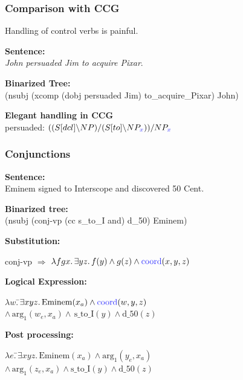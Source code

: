 \documentclass[mathserif,12pt]{beamer}
\newcommand{\hlight}[1]{{\color{blue!80} #1}}
\renewcommand{\land}{\wedge}
\newcommand{\lspace}{.\,}
\begin{document}
\begin{frame}[noframenumbering]
\frametitle{Comparison with CCG}

Handling of control verbs is painful.

\vspace{0.5cm}
\textbf{Sentence:}\\
\textsl{John persuaded Jim to acquire Pixar}.

\vspace{0.3cm}
\textbf{Binarized Tree:}\\
(nsubj (xcomp (dobj persuaded Jim) to\_acquire\_Pixar) John)

\pause
\vspace{0.3cm}
\textbf{Elegant handling in CCG} \\
\hspace{0.5cm} persuaded: $((S[dcl]\backslash NP)/(S[to]\backslash NP_{\hlight{x}}))/NP_{\hlight{x}}$
\end{frame}


\begin{frame}[noframenumbering]
\frametitle{Conjunctions}

\textbf{Sentence:} \\
{\centering Eminem signed to Interscope and discovered 50 Cent. \\} 

\vspace{0.3cm}  
\textbf{Binarized tree:} \\
{\centering (nsubj (conj-vp (cc s\_to\_I and) d\_50) Eminem) \\}

\pause
\vspace{0.3cm}  
\textbf{Substitution:} 

\begin{tabbing}
  conj-vp $\Rightarrow$ $\lambda f g x \lspace \exists y z \lspace f(y) \land g(z) \land \mathrm{\hlight{coord}}(x, y, z)$
\end{tabbing}

\vspace{0.3cm}  
\textbf{Logical Expression:}
\begin{tabbing}
  $\lambda w \lspace$\=$\exists x y z \lspace \mathrm{Eminem}(x_a) \land \mathrm{\hlight{coord}}(w, y, z)$ \\
\> $\land\, \mathrm{arg_1}(w_e, x_a) \land\, \mathrm{s\_to\_I}(y) \land \mathrm{d\_50}(z)$
\end{tabbing}

\pause
\textbf{Post processing:}
\begin{tabbing}
$\lambda e \lspace$\=$\exists x y z \lspace \mathrm{Eminem}(x_a) \land \mathrm{arg_1}(y_e, x_a)$ \\
\> $\land\,\mathrm{arg_1}(z_e, x_a) \land \mathrm{s\_to\_I}(y) \land \mathrm{d\_50}(z)$
\end{tabbing}
\end{frame}
\end{document}
